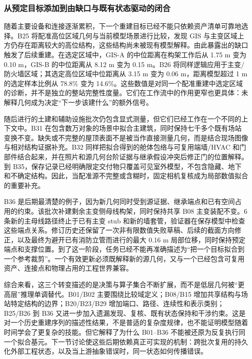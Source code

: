 \documentclass[10pt,a4paper]{article}
\begin{document}
\hypertarget{ux4eceux9884ux5b9aux76eeux6807ux6dfbux52a0ux5230ux7531ux7f3aux53e3ux4e0eux65e2ux6709ux72b6ux6001ux9a71ux52a8ux7684ux95edux5408}{%
\subsubsection{从预定目标添加到由缺口与既有状态驱动的闭合}\label{ux4eceux9884ux5b9aux76eeux6807ux6dfbux52a0ux5230ux7531ux7f3aux53e3ux4e0eux65e2ux6709ux72b6ux6001ux9a71ux52a8ux7684ux95edux5408}}

随着主要设备和连接逐渐累积，下一个重建目标已经不能只依赖资产清单可靠地选择。B25
将配准高位区域几何与当前模型场景进行比较，发现 GIS
与主变区域上方仍存在距离较大的高位结构，这些结构尚未被现有模型解释。由此暴露出的缺口触发了后续重建。在选定区域中，GIS-A
的中位距离在构架工作后从 1.75 m 变为 0.10 m，GIS-B 的中位距离从 8.12 m
变为 0.15 m。B26
将同样逻辑应用于主变/防火墙区域；其选定高位区域中位距离从 3.15 m 变为
0.06 m，距离模型超过 1 m 的选定样本比例从 78.8\% 变为
14.6\%。这些数值是对同一个配准重建中选定区域的诊断，并不是独立的整站完整性度量。它们在工作流中的作用更窄也更具体：未解释几何成为决定``下一步该建什么''的额外信号。

随后进行的土建和辅助设施批次仍包含显式测量，但它们已经工作在一个不同的上下文中。B31
在包含数万对象的场景中拟合主建筑，同时保持七千多个既有场站变换不变。缺失或不完整的屋顶表面不是被当作直接测量几何，而是结合现场图像与相对结构证据补充。B32
同样把拟合得到的舱体包络与可复用端墙/HVAC
和门部件结合起来，并在照片和源几何台阶证据与继承假设冲突后修正门的位置解释。到
B35，保存记录已经明确限定交付物只覆盖可见室外模型，不包含隐藏、地下和不确定结构。因此，当配准源不完整或含糊时，固定相机复核成为局部数值拟合的重要补充。

B36
是后期最清楚的例子，因为新几何同时受到源证据、继承端点和已有空间占用的约束。该批次补建剩余主变侧母线构架，同时保持共享
B08 主变装配不变。6 条新的主母线路径终止于已有主变 stub
和新的墙套管，验证器在保存模型中检查这些端点关系。修订历史还保留了一次非有限数值失败草稿、后续的截面方向修正，以及最终为避开已有消防立管而进行的最大
0.16 m
局部位移，同时保持预定端点和支撑位置。到了这一阶段，任务已经不能再准确描述为``把一个目标拟合到一个参考裁剪''。一个有效更新必须既解释新的源几何，又与一个已经包含可复用资产、连接点和物理占用的工程世界兼容。

综合来看，这三个转变描述的是决策与算子集合不断扩展，而不是低层几何被``更高层''推理单调替代。B01/B02
主要围绕比较域定义；B08/B15
增加共享结构与场站特定结构的边界；B20/B23/B29
增加端口、路径、连续性和表示类别；B25/B26 到 B36
又进一步加入遗漏发现、复核、既有状态保持和干涉约束。这是对一个历史重建序列的描述性结果，不是普适的复杂度规律，也不能证明模型随着时间学会了更复杂的技能。但它解释了为什么
B01--B36
不能被还原为反复执行同一个拟合基元。下一节讨论使这些后期依赖真正可实现的机制：跨批次复用的持久化外部工程状态，以及当上游抽象错误时，同一状态如何传播错误。
\end{document}
